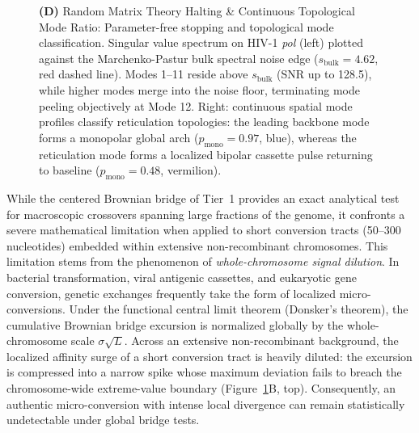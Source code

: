 \begin{figure}[!t]
{\textbf{(D)} Random Matrix Theory Halting \& Continuous Topological Mode Ratio: Parameter-free stopping and topological mode classification. Singular value spectrum on HIV-1 \textit{pol} (left) plotted against the Marchenko-Pastur bulk spectral noise edge ($s_{\text{bulk}} = 4.62$, red dashed line). Modes 1--11 reside above $s_{\text{bulk}}$ (SNR up to 128.5), while higher modes merge into the noise floor, terminating mode peeling objectively at Mode 12. Right: continuous spatial mode profiles classify reticulation topologies: the leading backbone mode forms a monopolar global arch ($p_{\text{mono}} = 0.97$, blue), whereas the reticulation mode forms a localized bipolar cassette pulse returning to baseline ($p_{\text{mono}} = 0.48$, vermilion).}
\label{fig:theory_force_field}
\end{figure}

While the centered Brownian bridge of Tier~1 provides an exact analytical test for macroscopic crossovers spanning large fractions of the genome, it confronts a severe mathematical limitation when applied to short conversion tracts (50--300 nucleotides) embedded within extensive non-recombinant chromosomes.
This limitation stems from the phenomenon of \textit{whole-chromosome signal dilution}.
In bacterial transformation, viral antigenic cassettes, and eukaryotic gene conversion, genetic exchanges frequently take the form of localized micro-conversions.
Under the functional central limit theorem (Donsker's theorem), the cumulative Brownian bridge excursion is normalized globally by the whole-chromosome scale $\sigma \sqrt{L}$.
Across an extensive non-recombinant background, the localized affinity surge of a short conversion tract is heavily diluted: the excursion is compressed into a narrow spike whose maximum deviation fails to breach the chromosome-wide extreme-value boundary (Figure~\ref{fig:theory_force_field}B, top).
Consequently, an authentic micro-conversion with intense local divergence can remain statistically undetectable under global bridge tests.

